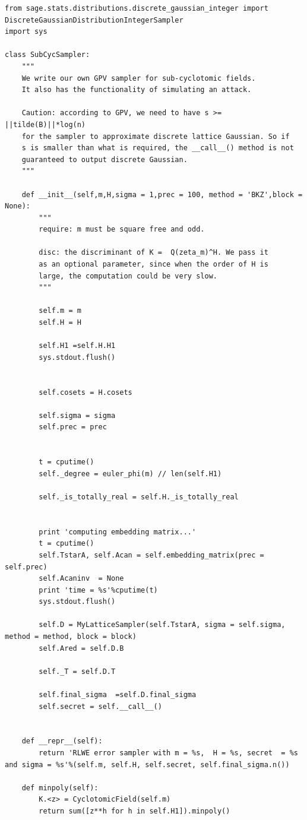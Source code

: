 \documentclass[envcountsame]{llncs}
\begin{document}
\scriptsize
\begin{verbatim}
from sage.stats.distributions.discrete_gaussian_integer import DiscreteGaussianDistributionIntegerSampler
import sys

class SubCycSampler:
    """
    We write our own GPV sampler for sub-cyclotomic fields.
    It also has the functionality of simulating an attack.

    Caution: according to GPV, we need to have s >= ||tilde(B)||*log(n)
    for the sampler to approximate discrete lattice Gaussian. So if
    s is smaller than what is required, the __call__() method is not
    guaranteed to output discrete Gaussian.
    """

    def __init__(self,m,H,sigma = 1,prec = 100, method = 'BKZ',block = None):
        """
        require: m must be square free and odd.

        disc: the discriminant of K =  Q(zeta_m)^H. We pass it
        as an optional parameter, since when the order of H is
        large, the computation could be very slow.
        """

        self.m = m
        self.H = H

        self.H1 =self.H.H1
        sys.stdout.flush()


        self.cosets = H.cosets

        self.sigma = sigma
        self.prec = prec


        t = cputime()
        self._degree = euler_phi(m) // len(self.H1)

        self._is_totally_real = self.H._is_totally_real


        print 'computing embedding matrix...'
        t = cputime()
        self.TstarA, self.Acan = self.embedding_matrix(prec = self.prec)
        self.Acaninv  = None
        print 'time = %s'%cputime(t)
        sys.stdout.flush()

        self.D = MyLatticeSampler(self.TstarA, sigma = self.sigma, method = method, block = block)
        self.Ared = self.D.B

        self._T = self.D.T

        self.final_sigma  =self.D.final_sigma
        self.secret = self.__call__()


    def __repr__(self):
        return 'RLWE error sampler with m = %s,  H = %s, secret  = %s and sigma = %s'%(self.m, self.H, self.secret, self.final_sigma.n())

    def minpoly(self):
        K.<z> = CyclotomicField(self.m)
        return sum([z**h for h in self.H1]).minpoly()


\end{verbatim}
\end{document}
